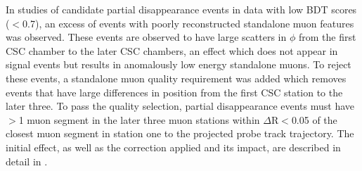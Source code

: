 In studies of candidate partial disappearance events in data with low BDT scores ($<$0.7), an excess of events with poorly reconstructed standalone muon features was observed.
These events are observed to have large scatters in $\phi$ from the first CSC chamber to the later CSC chambers, an effect which does not appear in signal events but results in anomalously low energy standalone muons.
To reject these events, a standalone muon quality requirement was added which removes events that have large differences in position from the first CSC station to the later three.
To pass the quality selection, partial disappearance events must have $>$1 muon segment in the later three muon stations within $\Delta$R$<$0.05 of the closest muon segment in station one to the projected probe track trajectory.
The initial effect, as well as the correction applied and its impact, are described in detail in .
